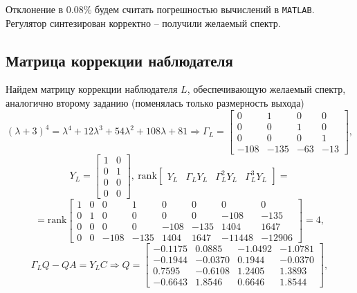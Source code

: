\documentclass[a4paper, 12pt]{article}
\begin{document}
    Отклонение в $0.08\%$ будем считать погрешностью вычислений в \texttt{MATLAB}.
    Регулятор синтезирован корректно -- получили желаемый спектр.


    \subsection{Матрица коррекции наблюдателя}
    Найдем матрицу коррекции наблюдателя $L$,
    обеспечивающую желаемый спектр,
    аналогично второму заданию (поменялась только размерность выхода)
    $$
    \left(\lambda+3\right)^4=\lambda^4+12\lambda^3+54\lambda^2+108\lambda+81\Rightarrow
    \Gamma_L=
    \begin{bmatrix}
        0 &1 &0 &0\\
       0 &0 &1 &0\\
       0 &0 &0 &1\\
       -108 &-135 &-63 &-13
    \end{bmatrix},
    $$
    $$
    Y_L=\begin{bmatrix}
        1 &0\\
        0 &1\\
        0 &0\\
        0 &0
    \end{bmatrix},\ \text{rank}\begin{bmatrix}
        Y_L &\Gamma_LY_L &\Gamma_L^2Y_L &\Gamma_L^3Y_L
    \end{bmatrix}=
    $$
    $$=\text{rank}\begin{bmatrix}
        1           &0           &0           &1           &0           &0           &0           &0\\
           0           &1           &0           &0           &0           &0        &-108        &-135\\
           0           &0           &0           &0        &-108        &-135        &1404        &1647\\
           0           &0        &-108        &-135        &1404        &1647      &-11448      &-12906
    \end{bmatrix}=4,
    $$
    $$
    \Gamma_LQ-QA=Y_LC\Rightarrow
    Q=\begin{bmatrix}
        -0.1175    &0.0885   &-1.0492   &-1.0781\\
   -0.1944   &-0.0370    &0.1944   &-0.0370\\
    0.7595   &-0.6108    &1.2405    &1.3893\\
   -0.6643    &1.8546    &0.6646    &1.8544
    \end{bmatrix},
    $$
\end{document}
